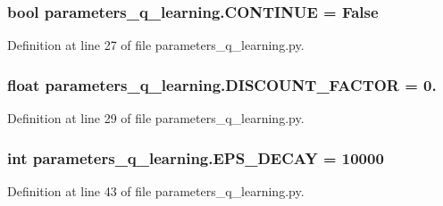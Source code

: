 \subsubsection[{\texorpdfstring{C\+O\+N\+T\+I\+N\+UE}{CONTINUE}}]{\setlength{\rightskip}{0pt plus 5cm}bool parameters\+\_\+q\+\_\+learning.\+C\+O\+N\+T\+I\+N\+UE = False}\hypertarget{namespaceparameters__q__learning_ac741bfed56fe758fadff980029dfcceb}{}\label{namespaceparameters__q__learning_ac741bfed56fe758fadff980029dfcceb}


Definition at line 27 of file parameters\+\_\+q\+\_\+learning.\+py.

\subsubsection[{\texorpdfstring{D\+I\+S\+C\+O\+U\+N\+T\+\_\+\+F\+A\+C\+T\+OR}{DISCOUNT_FACTOR}}]{\setlength{\rightskip}{0pt plus 5cm}float parameters\+\_\+q\+\_\+learning.\+D\+I\+S\+C\+O\+U\+N\+T\+\_\+\+F\+A\+C\+T\+OR = 0.}\hypertarget{namespaceparameters__q__learning_a88e249f3a5dd9dc91a27b3cdfe532973}{}\label{namespaceparameters__q__learning_a88e249f3a5dd9dc91a27b3cdfe532973}


Definition at line 29 of file parameters\+\_\+q\+\_\+learning.\+py.

\subsubsection[{\texorpdfstring{E\+P\+S\+\_\+\+D\+E\+C\+AY}{EPS_DECAY}}]{\setlength{\rightskip}{0pt plus 5cm}int parameters\+\_\+q\+\_\+learning.\+E\+P\+S\+\_\+\+D\+E\+C\+AY = 10000}\hypertarget{namespaceparameters__q__learning_af2f2d3bbf9c18d7c42d5ade6462bb2ba}{}\label{namespaceparameters__q__learning_af2f2d3bbf9c18d7c42d5ade6462bb2ba}


Definition at line 43 of file parameters\+\_\+q\+\_\+learning.\+py.

